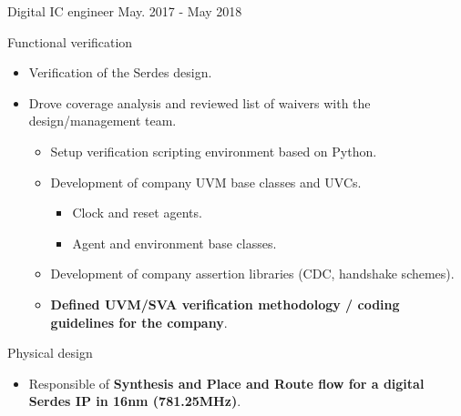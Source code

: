 \begin{cventries}
  \cventry
    {Digital IC engineer} %
    {} %
    {} %
    {May. 2017 - May 2018} %
    {
      \begin{cvitems} %
        \item {Functional verification}
        \begin{itemize}
          \item {Verification of the Serdes design.}
          \item {Drove coverage analysis and reviewed list of waivers with the design/management team.}
          \begin{itemize}
            \item {Setup verification scripting environment based on Python.}
            \item {Development of company UVM base classes and UVCs.}
              \begin{itemize}
                \item {Clock and reset agents.}
                \item {Agent and environment base classes.}
              \end{itemize}
            \item {Development of company assertion libraries (CDC, handshake schemes).}
            \item {\textbf{Defined UVM/SVA verification methodology / coding guidelines for the company}.}
          \end{itemize}
        \end{itemize}
        \item {Physical design}
        \begin{itemize}
          \item {Responsible of \textbf{Synthesis and Place and Route flow for a digital Serdes IP in 16nm (781.25MHz)}.}

\end{itemize}
\end{cvitems}}
\end{cventries}
